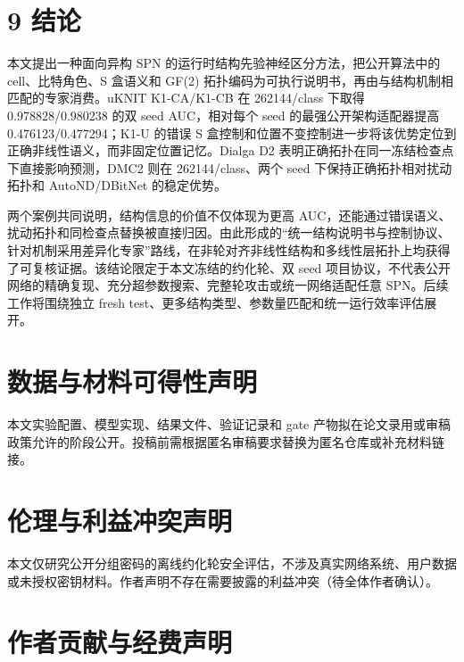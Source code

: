 \documentclass[
  a4paper,
  UTF8]{ctexart}
\begin{document}
\hypertarget{ux7ed3ux8bba}{%
\section{9 结论}\label{ux7ed3ux8bba}}

本文提出一种面向异构 SPN 的运行时结构先验神经区分方法，把公开算法中的
cell、比特角色、S 盒语义和 GF(2)
拓扑编码为可执行说明书，再由与结构机制相匹配的专家消费。uKNIT
K1-CA/K1-CB 在 262144/class 下取得 0.978828/0.980238 的双 seed
AUC，相对每个 seed 的最强公开架构适配器提高
0.476123/0.477294；K1-U
的错误 S 盒控制和位置不变控制进一步将该优势定位到正确非线性语义，而非固定位置记忆。Dialga
D2 表明正确拓扑在同一冻结检查点下直接影响预测，DMC2 则在
262144/class、两个 seed 下保持正确拓扑相对扰动拓扑和 AutoND/DBitNet
的稳定优势。

两个案例共同说明，结构信息的价值不仅体现为更高
AUC，还能通过错误语义、扰动拓扑和同检查点替换被直接归因。由此形成的``统一结构说明书与控制协议、针对机制采用差异化专家''路线，在非轮对齐非线性结构和多线性层拓扑上均获得了可复核证据。该结论限定于本文冻结的约化轮、双
seed
项目协议，不代表公开网络的精确复现、充分超参数搜索、完整轮攻击或统一网络适配任意
SPN。后续工作将围绕独立 fresh
test、更多结构类型、参数量匹配和统一运行效率评估展开。

\hypertarget{ux6570ux636eux4e0eux6750ux6599ux53efux5f97ux6027ux58f0ux660e}{%
\section{数据与材料可得性声明}\label{ux6570ux636eux4e0eux6750ux6599ux53efux5f97ux6027ux58f0ux660e}}

本文实验配置、模型实现、结果文件、验证记录和 gate
产物拟在论文录用或审稿政策允许的阶段公开。投稿前需根据匿名审稿要求替换为匿名仓库或补充材料链接。

\hypertarget{ux4f26ux7406ux4e0eux5229ux76caux51b2ux7a81ux58f0ux660e}{%
\section{伦理与利益冲突声明}\label{ux4f26ux7406ux4e0eux5229ux76caux51b2ux7a81ux58f0ux660e}}

本文仅研究公开分组密码的离线约化轮安全评估，不涉及真实网络系统、用户数据或未授权密钥材料。作者声明不存在需要披露的利益冲突（待全体作者确认）。

\hypertarget{ux4f5cux8005ux8d21ux732eux4e0eux7ecfux8d39ux58f0ux660e}{%
\section{作者贡献与经费声明}\label{ux4f5cux8005ux8d21ux732eux4e0eux7ecfux8d39ux58f0ux660e}}
\end{document}
